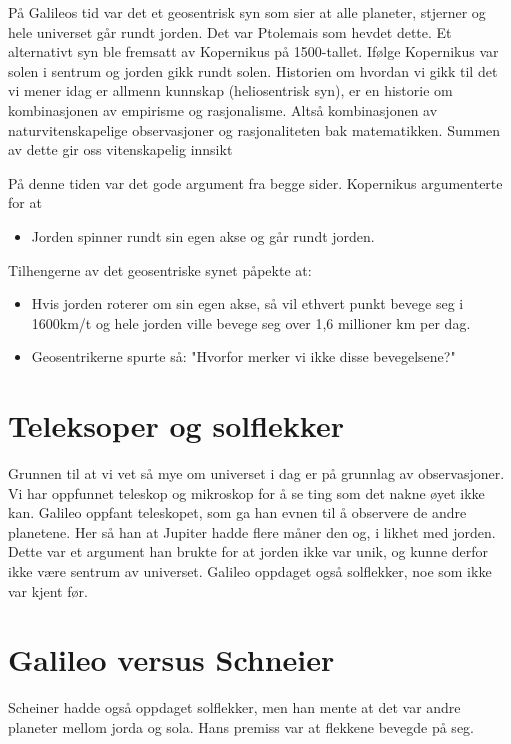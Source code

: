 \documentclass[11pt]{article}
\begin{document}
På Galileos tid var det et geosentrisk syn som sier at alle planeter, stjerner og hele universet går rundt jorden. Det var Ptolemais som hevdet dette. Et alternativt
syn ble fremsatt av Kopernikus på 1500-tallet. Ifølge Kopernikus var solen i sentrum og jorden gikk rundt solen. Historien om hvordan vi gikk til det vi mener idag er allmenn kunnskap (heliosentrisk syn), er en historie om kombinasjonen av empirisme og rasjonalisme. Altså kombinasjonen av naturvitenskapelige observasjoner og 
rasjonaliteten bak matematikken. Summen av dette gir oss vitenskapelig innsikt


På denne tiden var det gode argument fra begge sider. Kopernikus argumenterte for at
\begin{itemize}
    \item Jorden spinner rundt sin egen akse og går rundt jorden.
\end{itemize}

Tilhengerne av det geosentriske synet påpekte at:
\begin{itemize}
    \item Hvis jorden roterer om sin egen akse, så vil ethvert punkt bevege seg i 1600km/t og hele jorden ville bevege seg over 1,6 millioner km per dag.
    \item Geosentrikerne spurte så: "Hvorfor merker vi ikke disse bevegelsene?"
\end{itemize}


\section{Teleksoper og solflekker}

Grunnen til at vi vet så mye om universet i dag er på grunnlag av observasjoner. Vi har oppfunnet teleskop og mikroskop for å se
ting som det nakne øyet ikke kan. Galileo oppfant teleskopet, som ga han evnen til å observere de andre planetene. 
Her så han at Jupiter hadde flere måner den og, i likhet med jorden. Dette var et argument han brukte for at jorden ikke var unik, og kunne derfor ikke være sentrum av universet.
Galileo oppdaget også solflekker, noe som ikke var kjent før.


\section{Galileo versus Schneier}

Scheiner hadde også oppdaget solflekker, men han mente at det var andre planeter mellom jorda og sola. Hans premiss var at flekkene bevegde på seg.
\end{document}
